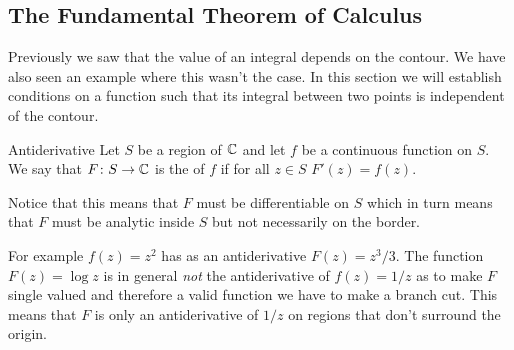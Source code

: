 \documentclass{article}
\begin{document}
    \subsection{The Fundamental Theorem of Calculus}
    Previously we saw that the value of an integral depends on the contour.
    We have also seen an example where this wasn't the case.
    In this section we will establish conditions on a function such that its integral between two points is independent of the contour.
    \begin{definition}{Antiderivative}{}
        Let \(S\) be a region of \(\mathbb{C}\) and let \(f\) be a continuous function on \(S\).
        We say that \(F\colon S\to\mathbb{C}\) is the  of \(f\) if for all \(z\in S\) \(F'(z) = f(z)\).
    \end{definition}
    Notice that this means that \(F\) must be differentiable on \(S\) which in turn means that \(F\) must be analytic inside \(S\) but not necessarily on the border.
    
    For example \(f(z) = z^2\) has as an antiderivative \(F(z) = z^3/3\).
    The function \(F(z) = \log z\) is in general \emph{not} the antiderivative of \(f(z) = 1/z\) as to make \(F\) single valued and therefore a valid function we have to make a branch cut.
    This means that \(F\) is only an antiderivative of \(1/z\) on regions that don't surround the origin.
    
\end{document}
